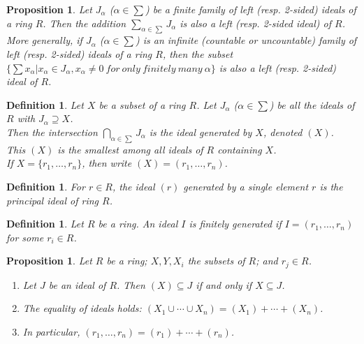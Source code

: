 \documentclass[a4paper,8pt]{article}
\theoremstyle{theorem}
\newtheorem{proposition}[theorem]{Proposition}
\newtheorem{definition}[theorem]{Definition}
\begin{document}
\begin{proposition}
Let $J_\alpha$ ($\alpha \in \sum$) be a finite family of left (resp. 2-sided) ideals of a ring $R$. Then the addition $\sum_{\alpha \in \sum} J_\alpha$ is also a left (resp. 2-sided ideal) of $R$.\\
More generally, if $J_\alpha$ ($\alpha \in \sum$) is an infinite (countable or uncountable) family of left (resp. 2-sided) ideals of a ring $R$, then the subset $\{\sum x_\alpha | x_\alpha \in J_\alpha, x_\alpha \neq 0 \ for \ only \ finitely \ many \ \alpha\}$ is also a left (resp. 2-sided) ideal of $R$.\\
\end{proposition}


\begin{definition}
Let $X$ be a subset of a ring $R$. Let $J_\alpha$ ($\alpha \in \sum$) be all the ideals of $R$ with $J_\alpha \supseteq X$.\\
Then the intersection $\bigcap\limits_{\alpha \in \sum}J_\alpha$ is the \textit{{\color{blue} ideal generated by $X$}}, denoted $(X)$.\\
This $(X)$ is the smallest among all ideals of $R$ containing $X$.\\
If $X=\{r_1, \ldots, r_n\}$, then write $(X)=(r_1, \ldots, r_n)$.\\
\end{definition}


\begin{definition}
For $r \in R$, the ideal $(r)$ generated by a single element $r$ is the \textit{{\color{blue} principal ideal of ring $R$}}.\\
\end{definition}


\begin{definition}
Let $R$ be a ring. An ideal $I$ is \textit{{\color{blue} finitely generated}} if $I=(r_1, \ldots, r_n)$ for some $r_i \in R$.\\
\end{definition}


\begin{proposition}
Let $R$ be a ring; $X, Y, X_i$ the subsets of $R$; and $r_j \in R$.
\begin{enumerate}[label=(\roman*)]
\item Let $J$ be an ideal of $R$. Then $(X) \subseteq J$ if and only if $X \subseteq J$.
\item The equality of ideals holds: $(X_1 \cup \cdots \cup X_n) = (X_1) + \cdots + (X_n)$.
\item In particular, $(r_1, \ldots, r_n) = (r_1) + \cdots + (r_n)$.
\end{enumerate}
\end{proposition}
\end{document}
